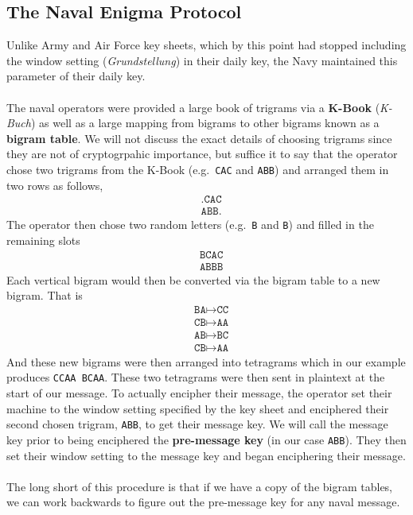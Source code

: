 \subsection{The Naval Enigma Protocol}
Unlike Army and Air Force key sheets, which by this point had stopped
including the window setting (\emph{Grundstellung}) in their daily
key, the Navy maintained this parameter of their daily key.
\\\\The naval operators were provided a large book of trigrams via a
{\bf{{K-Book}}} (\emph{K-Buch}) as well as a large mapping from
bigrams to other bigrams known as a {\bf{bigram table}}. We will not
discuss the exact details of choosing trigrams since they are not of
cryptogrpahic importance, but suffice it to say that the operator
chose two trigrams from the K-Book (e.g.\ \texttt{CAC} and
\texttt{ABB}) and arranged them in two rows as follows,
\begin{align*}
  & \texttt{.CAC} \\
  & \texttt{ABB.}
\end{align*}
The operator then chose two random letters (e.g.\ \texttt{B} and
\texttt{B}) and filled in the remaining slots
\begin{align*}
  & \texttt{BCAC} \\
  & \texttt{ABBB}
\end{align*}
Each vertical bigram would then be converted via the bigram table to
a new bigram. That is
\begin{align*}
  & \texttt{BA} \mapsto \texttt{CC} \\
  & \texttt{CB} \mapsto \texttt{AA} \\
  & \texttt{AB} \mapsto \texttt{BC} \\
  & \texttt{CB} \mapsto \texttt{AA}
\end{align*}
And these new bigrams were then arranged into tetragrams which in our
example produces \texttt{CCAA BCAA}. These two tetragrams were then
sent in plaintext at the start of our message. To actually encipher
their message, the operator set their machine to the window setting
specified by the key sheet and enciphered their second chosen
trigram, \texttt{ABB}, to get their message key. We will call the message
key prior to being enciphered the {\bf{pre-message key}} (in our
case \texttt{ABB}). They then set their window setting to the
message key and began enciphering their message.
\\\\The long short of this procedure is that if we have a copy of
the bigram tables, we can work backwards to figure out the
pre-message key for any naval message.

